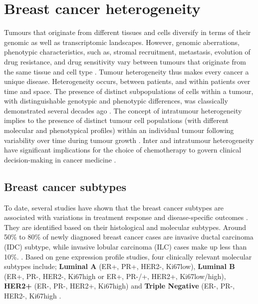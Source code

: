 
\section{Breast cancer heterogeneity}
 Tumours that originate from different tissues and cells diversify in terms of their genomic as well as transcriptomic landscapes.
 However, genomic aberrations, phenotypic characteristics, such as, stromal recruitment, metastasis, evolution of drug resistance, and drug sensitivity vary between tumours that originate from the same tissue and cell type \cite{vogelstein2013cancer}. 
Tumour heterogeneity thus makes every cancer a unique disease. Heterogeneity occurs, between patients, and within patients over time and space. 
The presence of distinct subpopulations of cells within a tumour, with distinguishable genotypic and phenotypic differences, was classically demonstrated several decades ago \cite{fidler1978tumor}.
The concept of intratumour heterogeneity implies to the presence of distinct tumour cell populations (with different molecular and phenotypical profiles) within an individual tumour following variability over time during tumour growth \cite{ellsworth2017molecular, welch2016tumor}. Inter and intratumour heterogeneity have significant implications for the choice of chemotherapy to govern clinical decision-making in cancer medicine \cite{bedard2013tumour}.



\subsection{Breast cancer subtypes}
To date, several studies have shown that the breast cancer subtypes are associated with variations in treatment response and disease-specific outcomes \cite{metzger2013patterns, arvold2011age}. 
They are identified based on their histological and molecular subtypes. 
Around 50\% to 80\% of newly diagnosed breast cancer cases are
invasive ductal carcinoma (IDC) subtype, while invasive lobular carcinoma (ILC) cases make up less than 10\%. \cite{henry2019breast}.
Based on  gene expression profile studies, four clinically relevant molecular subtypes include; \textbf{Luminal A} (ER+, PR+, HER2-, Ki67low), \textbf{Luminal B} (ER+, PR-, HER2-, Ki67high or ER+, PR-/+, HER2+, Ki67low/high), \textbf{HER2+} (ER-, PR-, HER2+, Ki67high) and \textbf{Triple Negative} (ER-, PR-, HER2-, Ki67high \cite{nadia2017gm, do2020histological}.

